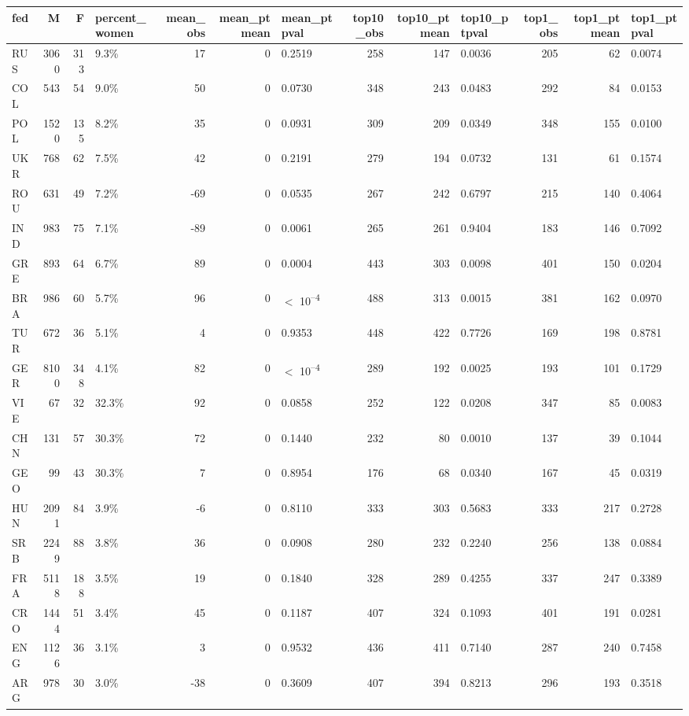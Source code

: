 
\begin{tabular}[t]{lrrlrrlrrlrrl}
\toprule
fed & M & F & percent_women & mean_obs & mean_ptmean & mean_ptpval & top10_obs & top10_ptmean & top10_ptpval & top1_obs & top1_ptmean & top1_ptpval\\
\midrule
RUS & 3060 & 313 & 9.3\% & 17 & 0 & 0.2519 & 258 & 147 & 0.0036 & 205 & 62 & 0.0074\\
COL & 543 & 54 & 9.0\% & 50 & 0 & 0.0730 & 348 & 243 & 0.0483 & 292 & 84 & 0.0153\\
POL & 1520 & 135 & 8.2\% & 35 & 0 & 0.0931 & 309 & 209 & 0.0349 & 348 & 155 & 0.0100\\
UKR & 768 & 62 & 7.5\% & 42 & 0 & 0.2191 & 279 & 194 & 0.0732 & 131 & 61 & 0.1574\\
ROU & 631 & 49 & 7.2\% & -69 & 0 & 0.0535 & 267 & 242 & 0.6797 & 215 & 140 & 0.4064\\
IND & 983 & 75 & 7.1\% & -89 & 0 & 0.0061 & 265 & 261 & 0.9404 & 183 & 146 & 0.7092\\
GRE & 893 & 64 & 6.7\% & 89 & 0 & 0.0004 & 443 & 303 & 0.0098 & 401 & 150 & 0.0204\\
BRA & 986 & 60 & 5.7\% & 96 & 0 & $<$ 10\textsuperscript{--4} & 488 & 313 & 0.0015 & 381 & 162 & 0.0970\\
TUR & 672 & 36 & 5.1\% & 4 & 0 & 0.9353 & 448 & 422 & 0.7726 & 169 & 198 & 0.8781\\
GER & 8100 & 348 & 4.1\% & 82 & 0 & $<$ 10\textsuperscript{--4} & 289 & 192 & 0.0025 & 193 & 101 & 0.1729\\
VIE & 67 & 32 & 32.3\% & 92 & 0 & 0.0858 & 252 & 122 & 0.0208 & 347 & 85 & 0.0083\\
CHN & 131 & 57 & 30.3\% & 72 & 0 & 0.1440 & 232 & 80 & 0.0010 & 137 & 39 & 0.1044\\
GEO & 99 & 43 & 30.3\% & 7 & 0 & 0.8954 & 176 & 68 & 0.0340 & 167 & 45 & 0.0319\\
HUN & 2091 & 84 & 3.9\% & -6 & 0 & 0.8110 & 333 & 303 & 0.5683 & 333 & 217 & 0.2728\\
SRB & 2249 & 88 & 3.8\% & 36 & 0 & 0.0908 & 280 & 232 & 0.2240 & 256 & 138 & 0.0884\\
FRA & 5118 & 188 & 3.5\% & 19 & 0 & 0.1840 & 328 & 289 & 0.4255 & 337 & 247 & 0.3389\\
CRO & 1444 & 51 & 3.4\% & 45 & 0 & 0.1187 & 407 & 324 & 0.1093 & 401 & 191 & 0.0281\\
ENG & 1126 & 36 & 3.1\% & 3 & 0 & 0.9532 & 436 & 411 & 0.7140 & 287 & 240 & 0.7458\\
ARG & 978 & 30 & 3.0\% & -38 & 0 & 0.3609 & 407 & 394 & 0.8213 & 296 & 193 & 0.3518\\

\end{tabular}
